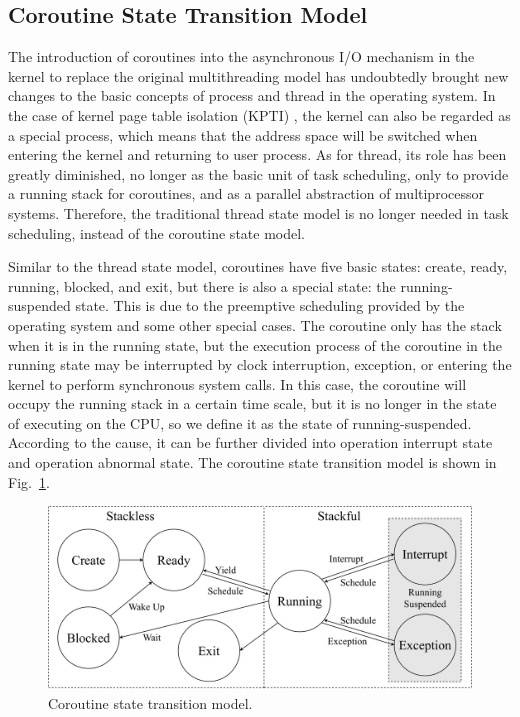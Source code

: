 \documentclass[sigconf,review,anonymous]{acmart}
\begin{document}
\subsection{Coroutine State Transition Model}
\label{section: state-transition}

The introduction of coroutines into the asynchronous I/O mechanism in the kernel to replace the original multithreading model has undoubtedly brought new changes to the basic concepts of process and thread in the operating system. In the case of kernel page table isolation (KPTI) \cite{kpti}, the kernel can also be regarded as a special process, which means that the address space will be switched when entering the kernel and returning to user process. As for thread, its role has been greatly diminished, no longer as the basic unit of task scheduling, only to provide a running stack for coroutines, and as a parallel abstraction of multiprocessor systems. Therefore, the traditional thread state model is no longer needed in task scheduling, instead of the coroutine state model.

Similar to the thread state model, coroutines have five basic states: create, ready, running, blocked, and exit, but there is also a special state: the running-suspended state. This is due to the preemptive scheduling provided by the operating system and some other special cases. The coroutine only has the stack when it is in the running state, but the execution process of the coroutine in the running state may be interrupted by clock interruption, exception, or entering the kernel to perform synchronous system calls. In this case, the coroutine will occupy the running stack in a certain time scale, but it is no longer in the state of executing on the CPU, so we define it as the state of running-suspended. According to the cause, it can be further divided into operation interrupt state and operation abnormal state. The coroutine state transition model is shown in Fig.~\ref{fig:state}.

\begin{figure}[h]
  \centering
  \includegraphics[width=\linewidth]{assets/cstate.pdf}
  \caption{Coroutine state transition model.}
  \label{fig:state}
\end{figure}
\end{document}
